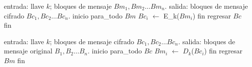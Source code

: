 \begin{pseudocodigo}[%
    caption={\Gls{gl:modo_de_operacion} \gls{gl:ecb}, cifrado.}%
  ]
  entrada: llave $ k $; bloques de mensaje $ Bm_1, Bm_2 \dots Bm_n $.
  salida:  bloques de mensaje cifrado $ Bc_1, Bc_2 \dots Bc_n $.
  inicio
    para_todo $Bm$
      $Bc_i$ $\gets$ E_k($Bm_i$)
    fin
    regresar $Bc$
  fin
\end{pseudocodigo}

\begin{pseudocodigo}[%
    caption={\Gls{gl:modo_de_operacion} \gls{gl:ecb}, descifrado.}%
  ]
  entrada: llave $ k $; bloques de mensaje cifrado $ Bc_1, Bc_2 \dots Bc_n $.
  salida:  bloques de mensaje original $ B_1, B_2 \dots B_n $.
  inicio
    para_todo $Bc$
      $Bm_i$ $\gets$ $D_k$($Bc_i$)
    fin
    regresar $Bm$
  fin
\end{pseudocodigo}
